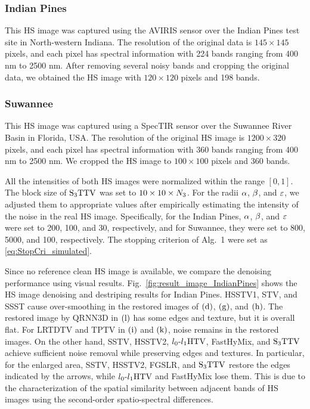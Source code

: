 \subsubsection{Indian Pines}  This HS image was captured using the AVIRIS sensor over the Indian Pines test site in North-western Indiana.
The resolution of the original data is $145 \times 145$ pixels, and each pixel has spectral information with 224 bands ranging from 400 nm to 2500 nm.
After removing several noisy bands and cropping the original data, we obtained the HS image with $120 \times 120$ pixels and 198 bands.

\subsubsection{Suwannee} This HS image was captured using a SpecTIR sensor over the Suwannee River Basin in Florida, USA.
The resolution of the original HS image is $1200 \times 320$ pixels, and each pixel has spectral information with 360 bands ranging from 400 nm to 2500 nm.
We cropped the HS image to $100 \times 100$ pixels and 360 bands.

All the intensities of both HS images were normalized within the range $[0, 1]$.
The block size of ${\text{S}_{3} \text{TTV}}$ was set to $10 \times 10 \times N_{3}$.
For the radii $\alpha$, $\beta$, and $\varepsilon$, we adjusted them to appropriate values after empirically estimating the intensity of the noise in the real HS image.
Specifically, for the Indian Pines, $\alpha$, $\beta$, and $\varepsilon$ were set to 200, 100, and 30, respectively, and for Suwannee, they were set to 800, 5000, and 100, respectively.
The stopping criterion of Alg.~1 were set as \eqref{eq:StopCri_simulated}.

Since no reference clean HS image is available, we compare the denoising performance using visual results.
Fig.~\ref{fig:result_image_IndianPines} shows the HS image denoising and destriping results for Indian Pines. 
HSSTV1, STV, and SSST cause over-smoothing in the restored images of $\text{(d)}$, $\text{(g)}$, and $\text{(h)}$. The restored image by QRNN3D in $\text{(l)}$ has some edges and texture, but it is overall flat. For LRTDTV and TPTV in $\text{(i)}$ and $\text{(k)}$, noise remains in the restored images. On the other hand, SSTV, HSSTV2, ${l_{0}\text{-}l_{1}\text{HTV}}$, FastHyMix, and ${\text{S}_{3} \text{TTV}}$ achieve sufficient noise removal while preserving edges and textures. In particular, for the enlarged area, SSTV, HSSTV2, FGSLR, and ${\text{S}_{3} \text{TTV}}$ restore the edges indicated by the arrows, while ${l_{0}\text{-}l_{1}\text{HTV}}$ and FastHyMix lose them. This is due to the characterization of the spatial similarity between adjacent bands of HS images using the second-order spatio-spectral differences.

